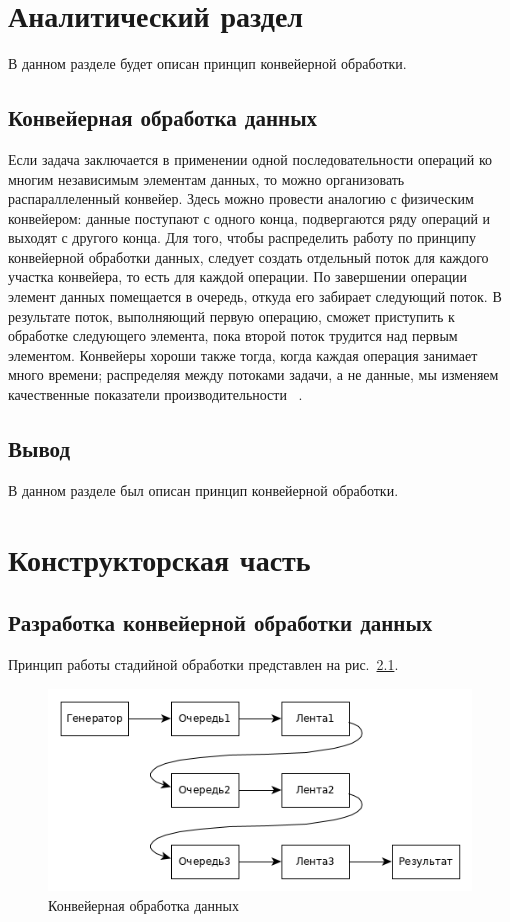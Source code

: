 \documentclass[12pt, a4paper]{report}
\begin{document}
    \chapter{Аналитический раздел}
   	\vspace{-0.5cm}В данном разделе будет описан принцип конвейерной обработки.
   
	\section{Конвейерная обработка данных}
	\hspace{0.5cm}Если задача заключается в применении одной последовательности операций ко многим независимым элементам данных, то можно организовать
	распараллеленный конвейер. Здесь можно провести аналогию с физическим
	конвейером: данные поступают с одного конца, подвергаются ряду операций и выходят с другого конца.
	Для того, чтобы распределить работу по принципу конвейерной обработки данных, следует создать отдельный поток для каждого участка конвейера, то есть для каждой операции. По завершении операции элемент
	данных помещается в очередь, откуда его забирает следующий поток. В
	результате поток, выполняющий первую операцию, сможет приступить к
	обработке следующего элемента, пока второй поток трудится над первым
	элементом. Конвейеры хороши также тогда, когда каждая операция занимает много времени; распределяя между потоками задачи, а не данные, мы
	изменяем качественные показатели производительности ~\cite{devcpp}.

	\section{Вывод}
	\hspace{0.5cm}В данном разделе был описан принцип конвейерной обработки.
	
	\chapter{Конструкторская часть}
		\section{Разработка конвейерной обработки данных}        
	
	
	Принцип работы стадийной обработки представлен на рис.~\ref{ris:matr_dl_sh1}.
	\begin{figure}[h]
		\centering
		{
			\includegraphics[scale=0.85]{ris.png}

			\caption{Конвейерная обработка данных}
			\label{ris:matr_dl_sh1}
		}
	\end{figure}	
	
\end{document}

